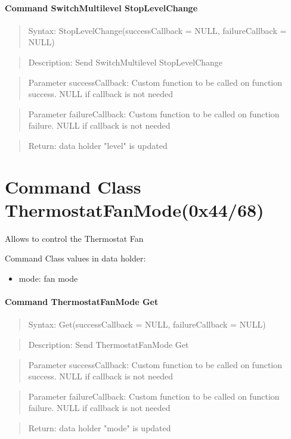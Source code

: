 \paragraph {Command SwitchMultilevel StopLevelChange}
\begin{quote} Syntax: StopLevelChange(successCallback = NULL, failureCallback = NULL)\end{quote}
\begin{quote} Description: Send SwitchMultilevel StopLevelChange\end{quote}
\begin{quote} Parameter successCallback: Custom function to be called on function success. NULL if callback is not needed\end{quote}
\begin{quote} Parameter failureCallback: Custom function to be called on function failure. NULL if callback is not needed\end{quote}
\begin{quote} Return: data holder "level" is updated\end{quote}

\section{Command Class ThermostatFanMode(0x44/68)}

Allows to control the Thermostat Fan

Command Class values in data holder:
\begin{itemize}
\item mode: fan mode
\end{itemize}

\paragraph {Command ThermostatFanMode Get}
\begin{quote} Syntax: Get(successCallback = NULL, failureCallback = NULL)\end{quote}
\begin{quote} Description: Send ThermostatFanMode Get\end{quote}
\begin{quote} Parameter successCallback: Custom function to be called on function success. NULL if callback is not needed\end{quote}
\begin{quote} Parameter failureCallback: Custom function to be called on function failure. NULL if callback is not needed\end{quote}
\begin{quote} Return: data holder "mode" is updated\end{quote}

